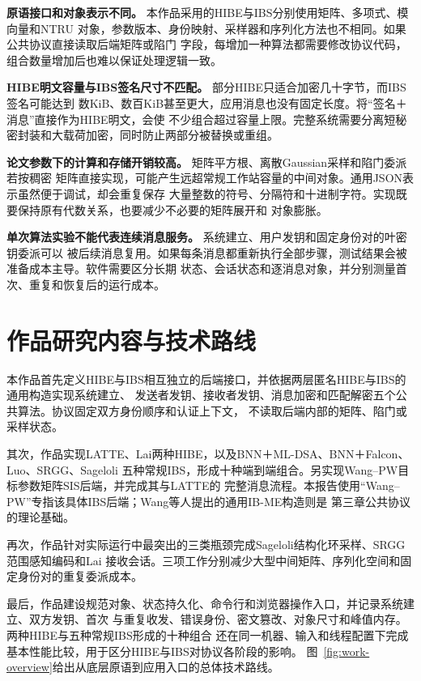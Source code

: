 \textbf{原语接口和对象表示不同。} 本作品采用的HIBE与IBS分别使用矩阵、多项式、模向量和NTRU
对象，参数版本、身份映射、采样器和序列化方法也不相同。如果公共协议直接读取后端矩阵或陷门
字段，每增加一种算法都需要修改协议代码，组合数量增加后也难以保证处理逻辑一致。

\textbf{HIBE明文容量与IBS签名尺寸不匹配。} 部分HIBE只适合加密几十字节，而IBS签名可能达到
数KiB、数百KiB甚至更大，应用消息也没有固定长度。将“签名＋消息”直接作为HIBE明文，会使
不少组合超过容量上限。完整系统需要分离短秘密封装和大载荷加密，同时防止两部分被替换或重组。

\textbf{论文参数下的计算和存储开销较高。} 矩阵平方根、离散Gaussian采样和陷门委派若按稠密
矩阵直接实现，可能产生远超常规工作站容量的中间对象。通用JSON表示虽然便于调试，却会重复保存
大量整数的符号、分隔符和十进制字符。实现既要保持原有代数关系，也要减少不必要的矩阵展开和
对象膨胀。

\textbf{单次算法实验不能代表连续消息服务。} 系统建立、用户发钥和固定身份对的叶密钥委派可以
被后续消息复用。如果每条消息都重新执行全部步骤，测试结果会被准备成本主导。软件需要区分长期
状态、会话状态和逐消息对象，并分别测量首次、重复和恢复后的运行成本。

\section{作品研究内容与技术路线}

本作品首先定义HIBE与IBS相互独立的后端接口，并依据两层匿名HIBE与IBS的通用构造实现系统建立、
发送者发钥、接收者发钥、消息加密和匹配解密五个公共算法。协议固定双方身份顺序和认证上下文，
不读取后端内部的矩阵、陷门或采样状态。

其次，作品实现LATTE、Lai两种HIBE，以及BNN＋ML-DSA、BNN＋Falcon、Luo、SRGG、Sageloli
五种常规IBS，形成十种端到端组合。另实现Wang--PW目标参数矩阵SIS后端，并完成其与LATTE的
完整消息流程。本报告使用“Wang--PW”专指该具体IBS后端；Wang等人提出的通用IB-ME构造则是
第三章公共协议的理论基础。

再次，作品针对实际运行中最突出的三类瓶颈完成Sageloli结构化环采样、SRGG范围感知编码和Lai
接收会话。三项工作分别减少大型中间矩阵、序列化空间和固定身份对的重复委派成本。

最后，作品建设规范对象、状态持久化、命令行和浏览器操作入口，并记录系统建立、双方发钥、首次
与重复收发、错误身份、密文篡改、对象尺寸和峰值内存。两种HIBE与五种常规IBS形成的十种组合
还在同一机器、输入和线程配置下完成基本性能比较，用于区分HIBE与IBS对协议各阶段的影响。
图~\ref{fig:work-overview}给出从底层原语到应用入口的总体技术路线。

